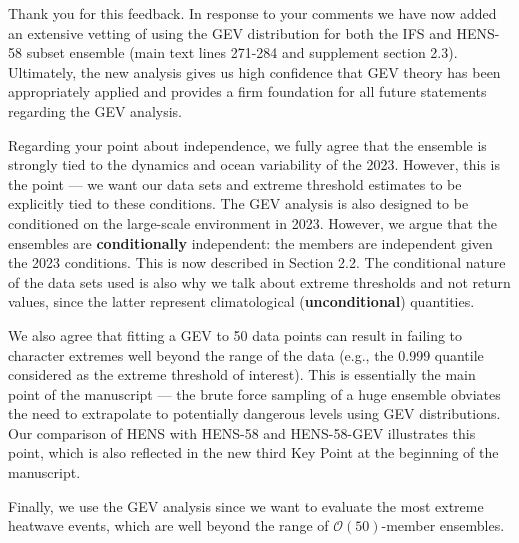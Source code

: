 \documentclass[11pt]{article}
\newcommand{\newTxt}{\textcolor{cadmiumgreen}}
\begin{document}
\begin{enumerate}

    \newTxt{Thank you for this feedback. In response to your comments we have now added an extensive vetting of using the GEV distribution for both the IFS and HENS-58 subset ensemble (main text lines 271-284 and supplement section 2.3). Ultimately, the new analysis gives us high confidence that GEV theory has been appropriately applied and provides a firm foundation for all future statements regarding the GEV analysis.}

    \newTxt{Regarding your point about independence, we fully agree that the ensemble is strongly tied to the dynamics and ocean variability of the 2023. However, this is the point --- we want our data sets and extreme threshold estimates to be explicitly tied to these conditions. The GEV analysis is also designed to be conditioned on the large-scale environment in 2023. However, we argue that the ensembles are \textbf{conditionally} independent: the members are independent given the 2023 conditions. This is now described in Section 2.2. The conditional nature of the data sets used is also why we talk about extreme thresholds and not return values, since the latter represent climatological (\textbf{unconditional}) quantities.} %

    \newTxt{We also agree that fitting a GEV to 50 data points can result in failing to character extremes well beyond the range of the data (e.g., the 0.999 quantile considered as the extreme threshold of interest). This is essentially the main point of the manuscript --- the brute force sampling of a huge ensemble obviates the need to extrapolate to potentially dangerous levels using GEV distributions. Our comparison of HENS with HENS-58 and HENS-58-GEV illustrates this point, which is also reflected in the new third Key Point at the beginning of the manuscript.}

    \newTxt{Finally, we use the GEV analysis since we want to evaluate the most extreme heatwave events, which are well beyond the range of $\mathcal{O}(50)$-member ensembles.}
    
\end{enumerate}
\end{document}
